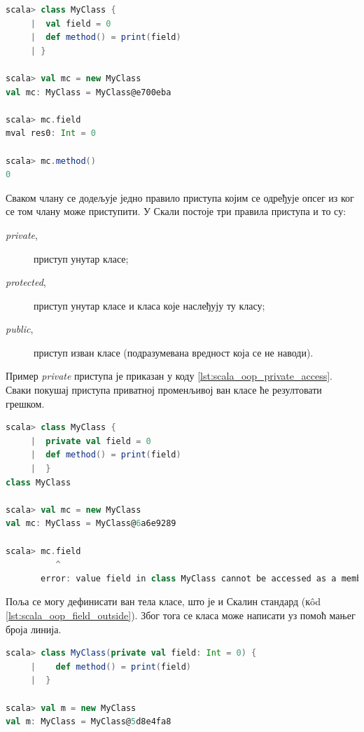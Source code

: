 \documentclass[12pt,oneside]{memoir}
\begin{document}
\begin{lstlisting}[language=Scala, caption={Чланови класе}, label={lst:scala_oop_members_class}]
scala> class MyClass {
     |  val field = 0
     |  def method() = print(field)
     | }

scala> val mc = new MyClass
val mc: MyClass = MyClass@e700eba

scala> mc.field
mval res0: Int = 0

scala> mc.method()
0
\end{lstlisting}

Сваком члану се додељује једно правило приступа којим се одређује опсег из ког се том члану може приступити. У Скали постоје три правила приступа и то су:

\begin{description}
\item[\textit{private},] приступ унутар класе;
\item[\textit{protected},] приступ унутар класе и класа које наслеђују ту класу;
\item[\textit{public},] приступ изван класе (подразумевана вредност која се не наводи).
\end{description}

Пример \textit{private} приступа је приказан у коду \ref{lst:scala_oop_private_access}. Сваки покушај приступа приватној променљивој ван класе ће резултовати грешком.

\begin{lstlisting}[language=Scala, caption={Пример private правила приступа}, label={lst:scala_oop_private_access}]
scala> class MyClass {
     |  private val field = 0
     |  def method() = print(field)
     |  }
class MyClass

scala> val mc = new MyClass
val mc: MyClass = MyClass@6a6e9289

scala> mc.field
          ^
       error: value field in class MyClass cannot be accessed as a member of MyClass from class 
\end{lstlisting}

Поља се могу дефинисати ван тела класе, што је и Скалин стандард (к\^ od \ref{lst:scala_oop_field_outside}). Због тога се класа може написати уз помоћ мањег броја линија. 

\begin{lstlisting}[language=Scala, caption={Дефиниција поља ван тела класе}, label={lst:scala_oop_field_outside}]
scala> class MyClass(private val field: Int = 0) {
     |    def method() = print(field)
     |  }

scala> val m = new MyClass
val m: MyClass = MyClass@5d8e4fa8
\end{lstlisting}
\end{document}
